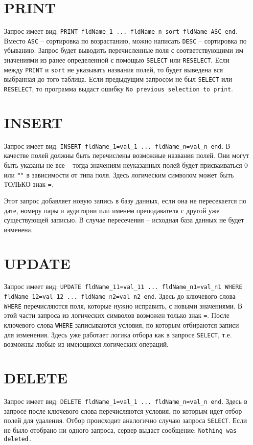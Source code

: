 \documentclass{article}
\begin{document}
\section*{PRINT}
Запрос имеет вид: \texttt{PRINT fldName\_1 ... fldName\_n sort fldName ASC end}. Вместо \texttt{ASC} – сортировка по возрастанию, можно написать \texttt{DESC} – сортировка по убыванию. Запрос будет выводить перечисленные поля с соответствующими им значениями из ранее определенной с помощью \texttt{SELECT} или \texttt{RESELECT}. Если между \texttt{PRINT} и \texttt{sort} не указывать названия полей, то будет выведена вся выбранная до того таблица. Если предыдущим запросом не был \texttt{SELECT} или \texttt{RESELECT}, то программа выдаст ошибку \texttt{No previous selection to print}.

\section*{INSERT}
Запрос имеет вид: \texttt{INSERT fldName\_1=val\_1 ... fldName\_n=val\_n end}. В качестве полей должны быть перечислены возможные названия полей. Они могут быть указаны не все – тогда значениям неуказанных полей будет присваиваться 0 или \texttt{""} в зависимости от типа поля. Здесь логическим символом может быть ТОЛЬКО знак \texttt{=}.

Этот запрос добавляет новую запись в базу данных, если она не пересекается по дате, номеру пары и аудитории или именем преподавателя с другой уже существующей записью. В случае пересечения – исходная база данных не будет изменена.

\section*{UPDATE}
Запрос имеет вид: \texttt{UPDATE fldName\_11=val\_11 ... fldName\_n1=val\_n1 WHERE fldName\_12=val\_12 ... fldName\_n2=val\_n2 end}. Здесь до ключевого слова \texttt{WHERE} перечисляются поля, которые нужно исправить, с новыми значениями. В этой части запроса из логических символов возможен только знак \texttt{=}. После ключевого слова \texttt{WHERE} записываются условия, по которым отбираются записи для изменения. Здесь уже работает логика отбора как в запросе \texttt{SELECT}, т.е. возможны любые из имеющихся логических операций.

\section*{DELETE}
Запрос имеет вид: \texttt{DELETE fldName\_1=val\_1 ... fldName\_n=val\_n end}. Здесь в запросе после ключевого слова перечисляются условия, по которым идет отбор полей для удаления. Отбор происходит аналогично случаю запроса \texttt{SELECT}. Если не было отобрано ни одного запроса, сервер выдаст сообщение: \texttt{Nothing was deleted.}
\end{document}
